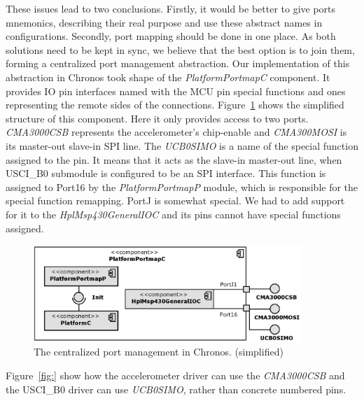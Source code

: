 These issues lead to two conclusions. Firstly, it would be better to give ports mnemonics, describing their real purpose and use these abstract names in configurations. Secondly, port mapping should be done in one place. As both solutions need to be kept in sync, we believe that the best option is to join them, forming a centralized port management abstraction. Our implementation of this abstraction in Chronos took shape of the \emph{PlatformPortmapC} component. It provides IO pin interfaces named with the MCU pin special functions and ones representing the remote sides of the connections. Figure~\ref{fig:platform_portmap_c} shows the simplified structure of this component. Here it only provides access to two ports. \emph{CMA3000CSB} represents the accelerometer's chip-enable and \emph{CMA300MOSI} is its master-out slave-in SPI line. The \emph{UCB0SIMO} is a name of the special function assigned to the pin. It means that it acts as the slave-in master-out line, when USCI\_B0 submodule is configured to be an SPI interface. This function is assigned to Port16 by the \emph{PlatformPortmapP} module, which is responsible for the special function remapping. PortJ is somewhat special. We had to add support for it to the  \emph{HplMsp430GeneralIOC} and its pins cannot have special functions assigned.

\begin{figure}[h]
  \centering
  \includegraphics[width=0.9\textwidth]{diagrams/platform_portmap_c.eps}
  \caption{The centralized port management in Chronos. (simplified)}
  \label{fig:platform_portmap_c}
\end{figure}

Figure~\ref{fig:} show how the accelerometer driver can use the \emph{CMA3000CSB} and the USCI\_B0 driver can use \emph{UCB0SIMO}, rather than concrete numbered pins.


